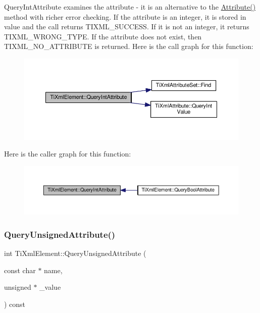 Query\+Int\+Attribute examines the attribute -\/ it is an alternative to the \hyperlink{class_ti_xml_element_a6042f518748f475a7ac4b4e0b509eb05}{Attribute()} method with richer error checking. If the attribute is an integer, it is stored in \textquotesingle{}value\textquotesingle{} and the call returns T\+I\+X\+M\+L\+\_\+\+S\+U\+C\+C\+E\+SS. If it is not an integer, it returns T\+I\+X\+M\+L\+\_\+\+W\+R\+O\+N\+G\+\_\+\+T\+Y\+PE. If the attribute does not exist, then T\+I\+X\+M\+L\+\_\+\+N\+O\+\_\+\+A\+T\+T\+R\+I\+B\+U\+TE is returned. Here is the call graph for this function\+:\nopagebreak
\begin{figure}[H]
\begin{center}
\leavevmode
\includegraphics[width=350pt]{class_ti_xml_element_a5c0f739e0f6f5905a201364532e54a60_cgraph}
\end{center}
\end{figure}
Here is the caller graph for this function\+:\nopagebreak
\begin{figure}[H]
\begin{center}
\leavevmode
\includegraphics[width=350pt]{class_ti_xml_element_a5c0f739e0f6f5905a201364532e54a60_icgraph}
\end{center}
\end{figure}
\mbox{\label{class_ti_xml_element_ab75c83543d4ace62f4c40d7e8e392fc3}} 
\subsubsection{\texorpdfstring{Query\+Unsigned\+Attribute()}{QueryUnsignedAttribute()}}
{\footnotesize\ttfamily int Ti\+Xml\+Element\+::\+Query\+Unsigned\+Attribute (\begin{DoxyParamCaption}\item[{const char $\ast$}]{name,  }\item[{unsigned $\ast$}]{\+\_\+value }\end{DoxyParamCaption}) const}



